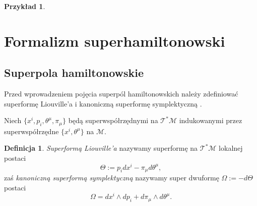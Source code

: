 \documentclass[11pt,a4paper]{report}
\theoremstyle{definition}
\newtheorem{example}[theorem]{Przykład}
\newtheorem{definition}[theorem]{Definicja}
\begin{document}
\begin{example}
\end{example}
			      				
\section{Formalizm superhamiltonowski}
			      				
\subsection{Superpola hamiltonowskie}
			      				
Przed wprowadzeniem pojęcia superpól hamiltonowskich należy zdefiniować superformę Liouville'a i kanoniczną superformę symplektyczną \cite{carinena,Ko77}.
			      				
Niech $\{ x^i, p_i, \theta^\mu, \pi_\mu \}$ będą superwspółrzędnymi na $\mathcal{T^*M}$ indukowanymi przez superwspółrzędne $\{ x^i, \theta^\mu\}$ na $\mathcal{M}$.
			      				
\begin{definition}
	\textit{Superformą Liouville'a} nazywamy superformę na $\mathcal{T^*M}$ lokalnej postaci 
	\begin{equation*}
		\Theta := p_i dx^i - \pi_\mu d \theta^\mu,
	\end{equation*}
	zaś \textit{kanoniczną superformą symplektyczną} nazywamy super dwuformę $\Omega := -d\Theta$ postaci
	\begin{equation*}
		\Omega = dx^i\wedge dp_i+d\pi_\mu \wedge d\theta^\mu.
	\end{equation*}
\end{definition}
			      				
\end{document}
